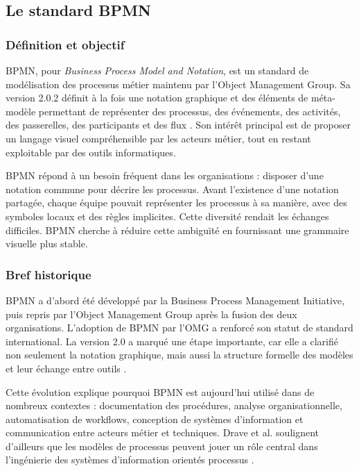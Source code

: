 \subsection{Le standard BPMN}

\subsubsection{Définition et objectif}

BPMN, pour \textit{Business Process Model and Notation}, est un standard de modélisation des processus métier maintenu par l'Object Management Group. Sa version 2.0.2 définit à la fois une notation graphique et des éléments de méta-modèle permettant de représenter des processus, des événements, des activités, des passerelles, des participants et des flux \cite{omg2013bpmn}. Son intérêt principal est de proposer un langage visuel compréhensible par les acteurs métier, tout en restant exploitable par des outils informatiques.

BPMN répond à un besoin fréquent dans les organisations : disposer d'une notation commune pour décrire les processus. Avant l'existence d'une notation partagée, chaque équipe pouvait représenter les processus à sa manière, avec des symboles locaux et des règles implicites. Cette diversité rendait les échanges difficiles. BPMN cherche à réduire cette ambiguïté en fournissant une grammaire visuelle plus stable.

\subsubsection{Bref historique}

BPMN a d'abord été développé par la Business Process Management Initiative, puis repris par l'Object Management Group après la fusion des deux organisations. L'adoption de BPMN par l'OMG a renforcé son statut de standard international. La version 2.0 a marqué une étape importante, car elle a clarifié non seulement la notation graphique, mais aussi la structure formelle des modèles et leur échange entre outils \cite{omg2013bpmn}.

Cette évolution explique pourquoi BPMN est aujourd'hui utilisé dans de nombreux contextes : documentation des procédures, analyse organisationnelle, automatisation de workflows, conception de systèmes d'information et communication entre acteurs métier et techniques. Drave et al. soulignent d'ailleurs que les modèles de processus peuvent jouer un rôle central dans l'ingénierie des systèmes d'information orientés processus \cite{drave2022}.

